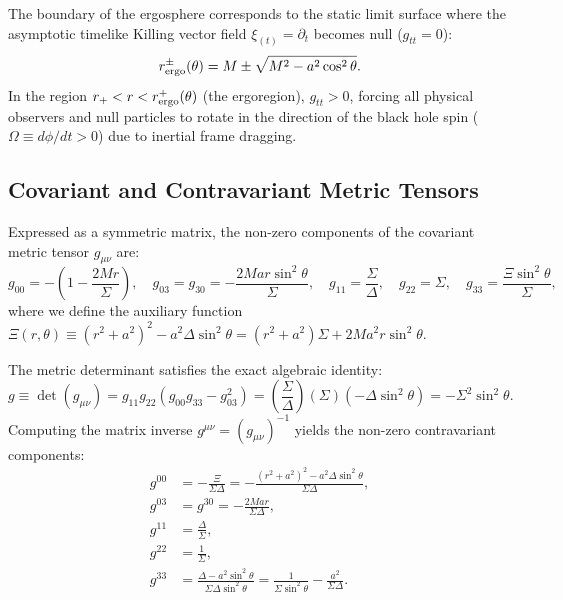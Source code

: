 The boundary of the ergosphere corresponds to the static limit surface where the asymptotic timelike Killing vector field $\xi_{(t)} = \partial_t$ becomes null ($g_{tt} = 0$):
\begin{equation}
    r_{\rm ergo}^\pm(\theta) = M \pm \sqrt{M^2 - a^2\cos^2\theta}.
    \label{eq:ergosphere_radii}
\end{equation}
In the region $r_+ < r < r_{\rm ergo}^+(\theta)$ (the ergoregion), $g_{tt} > 0$, forcing all physical observers and null particles to rotate in the direction of the black hole spin ($\Omega \equiv d\phi/dt > 0$) due to inertial frame dragging.

\subsection{Covariant and Contravariant Metric Tensors}
Expressed as a symmetric matrix, the non-zero components of the covariant metric tensor $g_{\mu\nu}$ are:
\begin{equation}
    g_{00} = -\left(1 - \frac{2Mr}{\Sigma}\right), \quad
    g_{03} = g_{30} = -\frac{2Mar\sin^2\theta}{\Sigma}, \quad
    g_{11} = \frac{\Sigma}{\Delta}, \quad
    g_{22} = \Sigma, \quad
    g_{33} = \frac{\Xi\sin^2\theta}{\Sigma},
\end{equation}
where we define the auxiliary function $\Xi(r, \theta) \equiv (r^2 + a^2)^2 - a^2\Delta\sin^2\theta = (r^2 + a^2)\Sigma + 2Ma^2r\sin^2\theta$.

The metric determinant satisfies the exact algebraic identity:
\begin{equation}
    g \equiv \det(g_{\mu\nu}) = g_{11} g_{22} (g_{00} g_{33} - g_{03}^2) = \left(\frac{\Sigma}{\Delta}\right)(\Sigma)\left(-\Delta\sin^2\theta\right) = -\Sigma^2\sin^2\theta.
    \label{eq:metric_determinant}
\end{equation}
Computing the matrix inverse $g^{\mu\nu} = (g_{\mu\nu})^{-1}$ yields the non-zero contravariant components:
\begin{align}
    g^{00} &= -\frac{\Xi}{\Sigma\Delta} = -\frac{(r^2 + a^2)^2 - a^2\Delta\sin^2\theta}{\Sigma\Delta}, \label{eq:g_inv_00} \\
    g^{03} &= g^{30} = -\frac{2Mar}{\Sigma\Delta}, \label{eq:g_inv_03} \\
    g^{11} &= \frac{\Delta}{\Sigma}, \label{eq:g_inv_11} \\
    g^{22} &= \frac{1}{\Sigma}, \label{eq:g_inv_22} \\
    g^{33} &= \frac{\Delta - a^2\sin^2\theta}{\Sigma\Delta\sin^2\theta} = \frac{1}{\Sigma\sin^2\theta} - \frac{a^2}{\Sigma\Delta}. \label{eq:g_inv_33}
\end{align}

